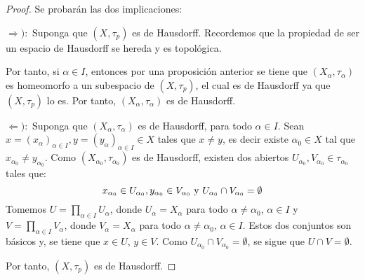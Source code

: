 \documentclass[12pt]{report}
\theoremstyle{largebreak}
\begin{document}
    \begin{proof}
        Se probarán las dos implicaciones:
        
        $\Rightarrow):$ Suponga que $(X,\tau_p)$ es de Hausdorff. Recordemos que la propiedad de ser un espacio de Hausdorff se hereda y es topológica.

        Por tanto, si $\alpha\in I$, entonces por una proposición anterior se tiene que $(X_\alpha,\tau_\alpha)$ es homeomorfo a un subespacio de $(X,\tau_p)$, el cual es de Hausdorff ya que $(X,\tau_p)$ lo es. Por tanto, $(X_\alpha,\tau_\alpha)$ es de Hausdorff.

        $\Leftarrow):$ Suponga que $(X_\alpha,\tau_\alpha)$ es de Hausdorff, para todo $\alpha\in I$. Sean $x=\left(x_\alpha \right)_{\alpha\in I}, y=\left(y_\alpha\right)_{\alpha\in I}\in X$ tales que $x\neq y$, es decir existe $\alpha_0\in X$ tal que $x_{\alpha_0}\neq y_{\alpha_0}$. Como $(X_{\alpha_0},\tau_{\alpha_0})$ es de Hausdorff, existen dos abiertos $U_{\alpha_0},V_{\alpha_0}\in\tau_{\alpha_0}$ tales que:
        \begin{equation}
            x_{\alpha_0}\in U_{\alpha_0},y_{\alpha_0}\in V_{\alpha_0}\textup{ y } U_{\alpha_0}\cap V_{\alpha_0}=\emptyset
        \end{equation}
        Tomemos $U=\prod_{\alpha\in I}U_\alpha$, donde $U_\alpha=X_\alpha$ para todo $\alpha\neq\alpha_0$, $\alpha\in I$ y $V=\prod_{\alpha\in I}V_\alpha$, donde $V_\alpha=X_\alpha$ para todo $\alpha\neq\alpha_0$, $\alpha\in I$. Estos dos conjuntos son básicos y, se tiene que $x\in U$, $y\in V$. Como $U_{\alpha_0}\cap V_{\alpha_0}=\emptyset$, se sigue que $U\cap V=\emptyset$.

        Por tanto, $(X,\tau_p)$ es de Hausdorff.
    \end{proof}
\end{document}
